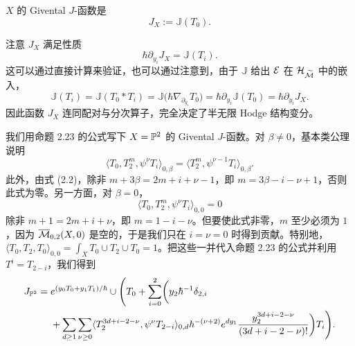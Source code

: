 \begin{definition}
$X$ 的 Givental $J$-函数是
\[
J_X:=\mathbb{J}(T_0).
\]
\end{definition}

\begin{remark}
注意 $J_X$ 满足性质
\[
\hbar\partial_{y_i}J_X=\mathbb{J}(T_i).
\]
这可以通过直接计算来验证，也可以通过注意到，由于 $\mathbb{J}$ 给出 $\mathcal{E}$ 在 $\mathcal{H}_{\widetilde{\mathcal{M}}}$ 中的嵌入，
\[
\mathbb{J}(T_i)=\mathbb{J}(T_0*T_i)=\mathbb{J}\bigl(\hbar\nabla_{\partial_{y_i}}T_0\bigr)=\hbar\partial_{y_i}\mathbb{J}(T_0)=\hbar\partial_{y_i}J_X.
\]
因此函数 $J_X$ 连同配对与分次算子，完全决定了半无限 Hodge 结构变分。
\end{remark}


\begin{example}
我们用命题 2.23 的公式写下 $X=\mathbb{P}^2$ 的 Givental $J$-函数。对 $\beta\neq0$，基本类公理说明
\[
\langle T_0,T_2^m,\psi^\nu T_i\rangle_{0,\beta}=\langle T_2^m,\psi^{\nu-1}T_i\rangle_{0,\beta}.
\]
此外，由式 (2.2)，除非 $m+3\beta=2m+i+\nu-1$，即 $m=3\beta-i-\nu+1$，否则此式为零。另一方面，对 $\beta=0$，
\[
\langle T_0,T_2^m,\psi^\nu T_i\rangle_{0,0}=0
\]
除非 $m+1=2m+i+\nu$，即 $m=1-i-\nu$。但要使此式非零，$m$ 至少必须为 $1$，因为 $\overline{\mathcal{M}}_{0,2}(X,0)$ 是空的，于是我们只在 $i=\nu=0$ 时得到贡献。特别地，$\langle T_0,T_2,T_0\rangle_{0,0}=\int_XT_0\cup T_2\cup T_0=1$。把这些一并代入命题 2.23 的公式并利用 $T^i=T_{2-i}$，我们得到
\[
\begin{aligned}
J_{\mathbb{P}^2}={}&e^{(y_0T_0+y_1T_1)/\hbar}\cup\Biggl(T_0+\sum_{i=0}^{2}\biggl(y_2\hbar^{-1}\delta_{2,i}\\
&+\sum_{d\ge1}\sum_{\nu\ge0}\langle T_2^{3d+i-2-\nu},\psi^\nu T_{2-i}\rangle_{0,d}\hbar^{-(\nu+2)}e^{dy_1}\frac{y_2^{3d+i-2-\nu}}{(3d+i-2-\nu)!}\biggr)T_i\Biggr).
\end{aligned}
\]
\end{example}


